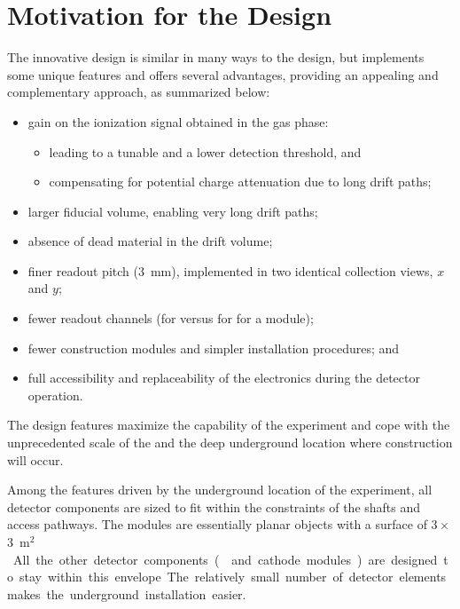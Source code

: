 \section{Motivation for the \dual Design} 
\label{sec:dp-execsum-design-motivation}

The innovative  design is similar in many ways to the  design, but implements some unique features and offers several advantages, providing an appealing and complementary approach, as summarized below:

\begin{itemize}
\item gain on the ionization signal obtained in the gas phase:
\begin{itemize}
\item  leading to a tunable  and a lower detection threshold, and
\item  compensating for potential charge attenuation due to long drift paths; 
\end{itemize}
\item  larger fiducial volume, enabling very long drift paths;
\item  absence of dead material in the  drift volume;
\item  finer readout pitch (\SI{3}{mm}), implemented in two identical collection views, $x$ and $y$;
\item  fewer readout channels (\dpnumcrpch for  versus \spnumch for  for a  \nominalmodsize module); 
\item  fewer construction modules and simpler installation procedures; and
\item  full accessibility and replaceability of the  electronics during the detector operation.
\end{itemize}

The  design features maximize the capability of the experiment and cope with the unprecedented scale of the  and the deep underground location where construction will occur.

Among the features driven by the underground location of the experiment, all detector components are sized to fit within the constraints of the  shafts and access pathways. The  modules are essentially planar objects with a surface of \num{3}\,$\times$\,\SI{3}{m$^2$}. All the other detector 
components ( and cathode modules) are  designed to stay within this envelope. The relatively small number of detector elements makes the underground installation easier.


